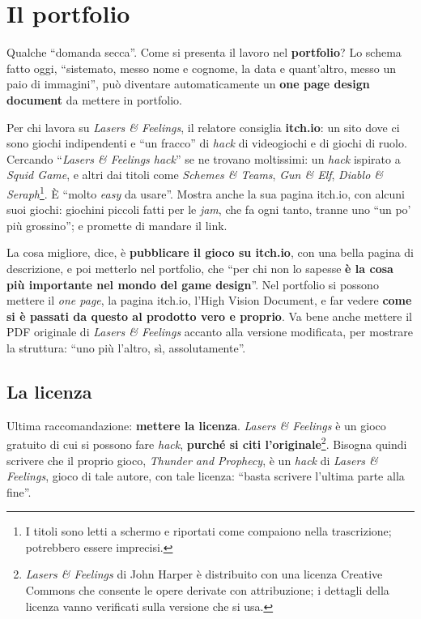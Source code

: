 \section{Il portfolio}
\label{z7:sec:portfolio}

Qualche ``domanda secca''. Come si presenta il lavoro nel \textbf{portfolio}? Lo
schema fatto oggi, ``sistemato, messo nome e cognome, la data e quant'altro, messo un
paio di immagini'', può diventare automaticamente un \textbf{one page design
document} da mettere in portfolio.

Per chi lavora su \emph{Lasers \& Feelings}, il relatore consiglia
\textbf{itch.io}: un sito dove ci sono giochi indipendenti e ``un fracco'' di
\emph{hack} di videogiochi e di giochi di ruolo. Cercando ``\emph{Lasers \& Feelings
hack}'' se ne trovano moltissimi: un \emph{hack} ispirato a \emph{Squid Game}, e
altri dai titoli come \emph{Schemes \& Teams}, \emph{Gun \& Elf}, \emph{Diablo \&
Seraph}\footnote{I titoli sono letti a schermo e riportati come compaiono nella
trascrizione; potrebbero essere imprecisi.}. È ``molto \emph{easy} da usare''.
Mostra anche la sua pagina itch.io, con alcuni suoi giochi: giochini piccoli fatti
per le \emph{jam}, che fa ogni tanto, tranne uno ``un po' più grossino''; e promette
di mandare il link.

La cosa migliore, dice, è \textbf{pubblicare il gioco su itch.io}, con una bella
pagina di descrizione, e poi metterlo nel portfolio, che ``per chi non lo sapesse
\textbf{è la cosa più importante nel mondo del game design}''. Nel portfolio si
possono mettere il \emph{one page}, la pagina itch.io, l'High Vision Document, e far
vedere \textbf{come si è passati da questo al prodotto vero e proprio}. Va bene anche
mettere il PDF originale di \emph{Lasers \& Feelings} accanto alla versione
modificata, per mostrare la struttura: ``uno più l'altro, sì, assolutamente''.

\subsection{La licenza}

Ultima raccomandazione: \textbf{mettere la licenza}. \emph{Lasers \& Feelings} è un
gioco gratuito di cui si possono fare \emph{hack}, \textbf{purché si citi
l'originale}\footnote{\emph{Lasers \& Feelings} di John Harper è distribuito con
una licenza Creative Commons che consente le opere derivate con attribuzione; i
dettagli della licenza vanno verificati sulla versione che si usa.}. Bisogna quindi
scrivere che il proprio gioco, \emph{Thunder and Prophecy}, è un \emph{hack} di
\emph{Lasers \& Feelings}, gioco di tale autore, con tale licenza: ``basta scrivere
l'ultima parte alla fine''.

